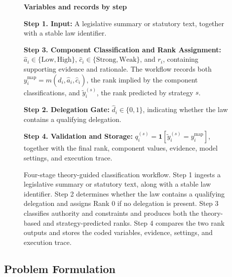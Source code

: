 \documentclass[conference]{IEEEtran}
\begin{document}
\begin{figure}[t]
{\begin{tikzpicture}
\end{tikzpicture}%
}

\vspace{0.3cm}
\begin{center}
  \textbf{Variables and records by step}
\end{center}
\vspace{0.1cm}

\noindent
\begin{minipage}[t]{0.48\textwidth}
\small
\textbf{Step 1. Input:} A legislative summary or statutory text, together with a stable law identifier.

\medskip
\textbf{Step 3. Component Classification and Rank Assignment:}
$\hat{a}_i \in \{\text{Low}, \text{High}\}$, $\hat{c}_i \in \{\text{Strong}, \text{Weak}\}$, and $r_i$, containing supporting evidence and rationale. The workflow records both $y_i^{\text{map}} = m(\hat{d}_i, \hat{a}_i, \hat{c}_i)$, the rank implied by the component classifications, and $\tilde{y}_i^{(s)}$, the rank predicted by strategy $s$.

\end{minipage}\hfill
\begin{minipage}[t]{0.48\textwidth}
\small
\textbf{Step 2. Delegation Gate:} $\hat{d}_i \in \{0, 1\}$, indicating whether the law contains a qualifying delegation.

\medskip
\textbf{Step 4. Validation and Storage:} $q_i^{(s)} = \mathbf{1}[\tilde{y}_i^{(s)} = y_i^{\text{map}}]$, together with the final rank, component values, evidence, model settings, and execution trace.
\end{minipage}

\vspace{0.2cm}
\caption{Four-stage theory-guided classification workflow. Step 1 ingests a legislative summary or statutory text, along with a stable law identifier. Step 2 determines whether the law contains a qualifying delegation and assigns Rank 0 if no delegation is present. Step 3 classifies authority and constraints and produces both the theory-based and strategy-predicted ranks. Step 4 compares the two rank outputs and stores the coded variables, evidence, settings, and execution trace.}
\label{fig:conceptual}
\end{figure}

\subsection{Problem Formulation}
\end{document}
